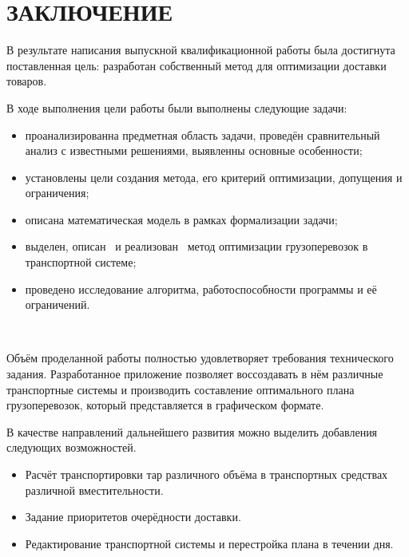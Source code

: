 \section*{ЗАКЛЮЧЕНИЕ}
	В результате написания выпускной квалификационной работы была достигнута поставленная цель: разработан собственный метод для оптимизации доставки товаров.
	
	В ходе выполнения цели работы были выполнены следующие задачи:
	\begin{itemize}
		\item проанализированна предметная область задачи, проведён сравнительный анализ с известными решениями, выявленны основные особенности;
		\item установлены цели создания метода, его критерий оптимизации, допущения и ограничения;
		\item описана математическая модель в рамках формализации задачи;
		\item выделен, описан \, и реализован \, метод оптимизации грузоперевозок в \, транспортной системе;
		\item проведено исследование алгоритма, работоспособности программы и её ограничений.
	\end{itemize}
	\,
	
	Объём проделанной работы полностью удовлетворяет требования технического задания. Разработанное приложение позволяет воссоздавать в нём различные транспортные системы и производить составление оптимального плана грузоперевозок, который представляется в графическом формате.
	
	В качестве направлений дальнейшего развития можно выделить добавления следующих возможностей.
	
	\begin{itemize}
		\item Расчёт транспортировки тар различного объёма в транспортных средствах различной вместительности.
		\item Задание приоритетов очерёдности доставки.
		\item Редактирование транспортной системы и перестройка плана в течении дня.
	\end{itemize}

\pagebreak
